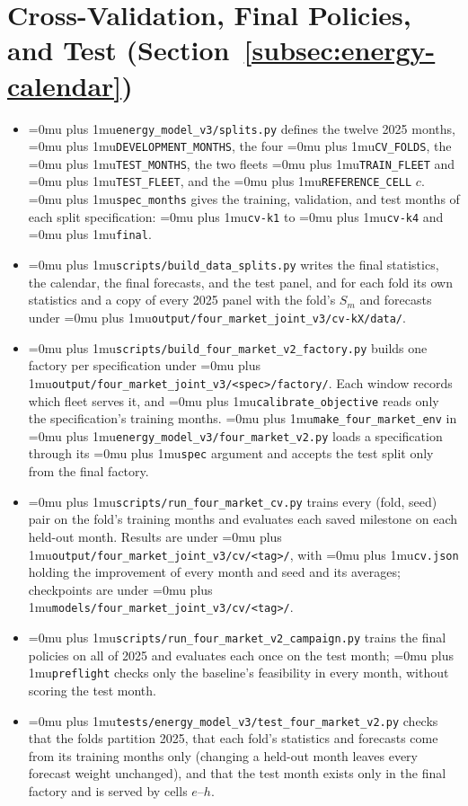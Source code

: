 \documentclass{UNCC-thesis}
\newcommand{\codepath}[1]{{\Urlmuskip=0mu plus 1mu\relax\nolinkurl{#1}}}
\begin{document}
\section{Cross-Validation, Final Policies, and Test
  (Section~\ref{subsec:energy-calendar})}
\begin{itemize}
  \item \codepath{energy_model_v3/splits.py} defines the twelve 2025 months,
        \codepath{DEVELOPMENT_MONTHS}, the four \codepath{CV_FOLDS}, the
        \codepath{TEST_MONTHS}, the two fleets \codepath{TRAIN_FLEET} and
        \codepath{TEST_FLEET}, and the \codepath{REFERENCE_CELL} \(c\).
        \codepath{spec_months} gives the training, validation, and test
        months of each split specification: \codepath{cv-k1} to
        \codepath{cv-k4} and \codepath{final}.
  \item \codepath{scripts/build_data_splits.py} writes the final statistics,
        the calendar, the final forecasts, and the test panel, and for each
        fold its own statistics and a copy of every 2025 panel with the
        fold's \(S_m\) and forecasts under
        \codepath{output/four_market_joint_v3/cv-kX/data/}.
  \item \codepath{scripts/build_four_market_v2_factory.py} builds one
        factory per specification under
        \codepath{output/four_market_joint_v3/<spec>/factory/}. Each window
        records which fleet serves it, and \codepath{calibrate_objective}
        reads only the specification's training months.
        \codepath{make_four_market_env} in
        \codepath{energy_model_v3/four_market_v2.py} loads a specification
        through its \codepath{spec} argument and accepts the test split only
        from the final factory.
  \item \codepath{scripts/run_four_market_cv.py} trains every (fold, seed)
        pair on the fold's training months and evaluates each saved
        milestone on each held-out month. Results are under
        \codepath{output/four_market_joint_v3/cv/<tag>/}, with
        \codepath{cv.json} holding the improvement of every month and seed
        and its averages; checkpoints are under
        \codepath{models/four_market_joint_v3/cv/<tag>/}.
  \item \codepath{scripts/run_four_market_v2_campaign.py} trains the final
        policies on all of 2025 and evaluates each once on the test month;
        \codepath{preflight} checks only the baseline's feasibility in every
        month, without scoring the test month.
  \item \codepath{tests/energy_model_v3/test_four_market_v2.py} checks that
        the folds partition 2025, that each fold's statistics and forecasts
        come from its training months only (changing a held-out month leaves
        every forecast weight unchanged), and that the test month exists only
        in the final factory and is served by cells \(e\)--\(h\).
\end{itemize}
\end{document}
